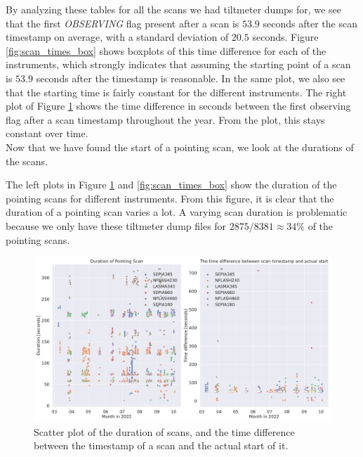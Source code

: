 By analyzing these tables for all the scans we had tiltmeter dumps for,
we see that the first \textit{OBSERVING} flag present after a scan is $53.9$ seconds after the scan timestamp on average, with a standard deviation of $20.5$ seconds.
Figure \ref{fig:scan_times_box} shows boxplots of this time difference for each of the instruments, which strongly indicates that assuming the starting point of a scan is $53.9$ seconds after
the timestamp is reasonable.
In the same plot, we also see that the starting time is fairly constant for the different instruments.
The right plot of Figure \ref{fig:scan_times_date} shows the time difference in seconds between the first observing flag after a scan timestamp throughout the year.
From the plot, this stays constant over time.\\

Now that we have found the start of a pointing scan, we look at the durations of the scans.

The left plots in Figure \ref{fig:scan_times_date} and \ref{fig:scan_times_box} show the duration of the pointing scans for different instruments.
From this figure, it is clear that the duration of a pointing scan varies a lot.
A varying scan duration is problematic because we only have these tiltmeter dump files for $2875/8381\approx 34\%$ of the pointing scans. 


\begin{figure}[H]
    \centering
    \includegraphics[width=1.1\textwidth]{Tiltmeter plots/scan_duration_distribution_date.pdf}
    \caption{Scatter plot of the duration of scans, and the time difference between the timestamp of a scan and the actual start of it.}
    \label{fig:scan_times_date}
\end{figure}

